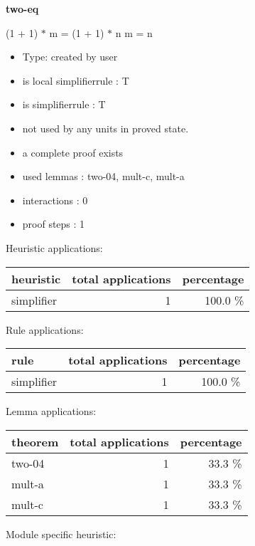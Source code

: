 \documentclass[a4paper]{article}
\begin{document}
\pagebreak

{\LARGE\bf two-eq}\label{lemma-two-eq}

\medskip

 \Fol (1 + 1) $*$ m = (1 + 1) $*$ n \Equiv m = n

\begin{itemize}

\item Type: created by user

\item is local simplifierrule : T
\item is simplifierrule : T
\item not used by any units in proved state.
\item       a complete proof exists
\item       used lemmas  : two-04, mult-c, mult-a
\item       interactions : 0
\item       proof steps  : 1
\end{itemize}

\medskip


Heuristic applications:

\begin{supertabular}{l|r|r}
heuristic	& total applications & percentage \\ \hline
simplifier & 1 & 100.0 \% \\

\end{supertabular}

Rule applications:

\begin{supertabular}{l|r|r}
rule	        & total applications & percentage \\ \hline
simplifier & 1 & 100.0 \% \\

\end{supertabular}

Lemma applications:

\begin{supertabular}{l|r|r}
theorem	        & total applications & percentage \\ \hline
two-04 & 1 & 33.3 \% \\
mult-a & 1 & 33.3 \% \\
mult-c & 1 & 33.3 \% \\

\end{supertabular}

Module specific heuristic:
\end{document}
